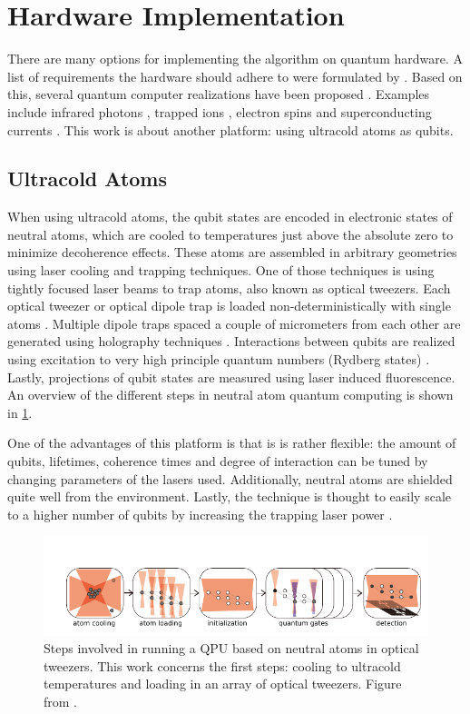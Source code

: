 \section{Hardware Implementation}

There are many options for implementing the algorithm on quantum hardware.
A list of requirements the hardware should adhere to were formulated by \cite{DiVincenzo2000} .
Based on this, several quantum computer realizations have been proposed \cite{Ladd2010}.
Examples include infrared photons \cite{Matthews2009}, trapped ions \cite{Benhelm2008,Schindler2013}, electron spins \cite{Press2008} and superconducting currents \cite{DiCarlo2009,Arute2019}. 
This work is about another platform: using ultracold atoms as qubits. 

\subsection{Ultracold Atoms}

When using ultracold atoms, the qubit states are encoded in electronic states of neutral atoms, which are cooled to temperatures just above the absolute zero to minimize decoherence effects. 
These atoms are assembled in arbitrary geometries using laser cooling and trapping techniques.
One of those techniques is using tightly focused laser beams to trap atoms, also known as optical tweezers.
Each optical tweezer or optical dipole trap \cite{Chu1986} is loaded non-deterministically with single atoms \cite{Schlosser2001}. 
Multiple dipole traps spaced a couple of micrometers from each other are generated using holography techniques \cite{Bergamini2004}.
Interactions between qubits are realized using excitation to very high principle quantum numbers (Rydberg states) \cite{Levine2018,Madjarov2020}. 
Lastly, projections of qubit states are measured using laser induced fluorescence.
An overview of the different steps in neutral atom quantum computing is shown in \cref{fig:ComputingSteps}.

One of the advantages of this platform is that is is rather flexible: the amount of qubits, lifetimes, coherence times and degree of interaction can be tuned by changing parameters of the lasers used. 
Additionally, neutral atoms are shielded quite well from the environment.
Lastly, the technique is thought to easily scale to a higher number of qubits by increasing the trapping laser power \cite{Henriet2020}.

\begin{figure}
	\centering
	\includegraphics[width=\linewidth]{figures/ComputingSteps.pdf}
	\caption{Steps involved in running a \ac{QPU} based on neutral atoms in optical tweezers. 
	This work concerns the first steps: cooling to ultracold temperatures and loading in an array of optical tweezers.
	Figure from \cite{Wu2021}.}
	\label{fig:ComputingSteps}
\end{figure}

